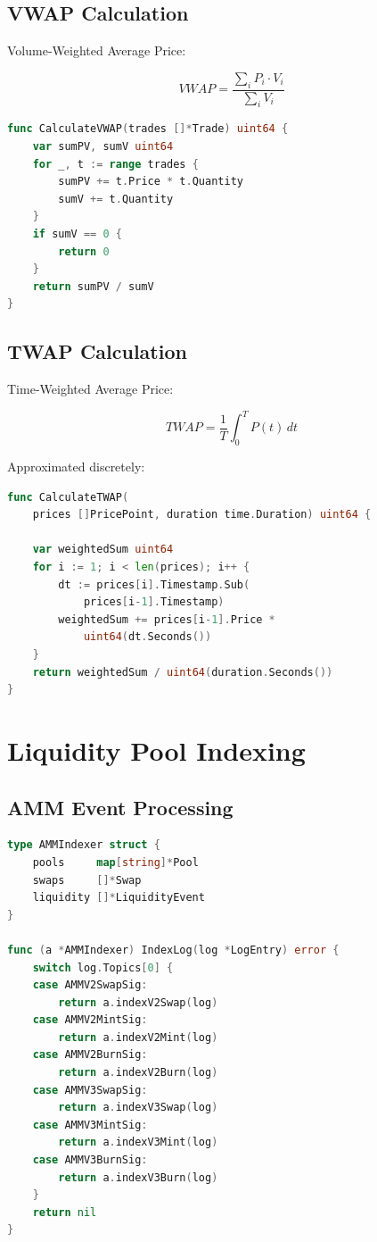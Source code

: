 \documentclass[11pt,twocolumn]{article}
\begin{document}
\subsection{VWAP Calculation}

Volume-Weighted Average Price:

\begin{equation}
VWAP = \frac{\sum_{i} P_i \cdot V_i}{\sum_{i} V_i}
\end{equation}

\begin{lstlisting}[language=Go,caption={VWAP computation}]
func CalculateVWAP(trades []*Trade) uint64 {
    var sumPV, sumV uint64
    for _, t := range trades {
        sumPV += t.Price * t.Quantity
        sumV += t.Quantity
    }
    if sumV == 0 {
        return 0
    }
    return sumPV / sumV
}
\end{lstlisting}

\subsection{TWAP Calculation}

Time-Weighted Average Price:

\begin{equation}
TWAP = \frac{1}{T} \int_{0}^{T} P(t) \, dt
\end{equation}

Approximated discretely:

\begin{lstlisting}[language=Go,caption={TWAP computation}]
func CalculateTWAP(
    prices []PricePoint, duration time.Duration) uint64 {

    var weightedSum uint64
    for i := 1; i < len(prices); i++ {
        dt := prices[i].Timestamp.Sub(
            prices[i-1].Timestamp)
        weightedSum += prices[i-1].Price *
            uint64(dt.Seconds())
    }
    return weightedSum / uint64(duration.Seconds())
}
\end{lstlisting}

\section{Liquidity Pool Indexing}

\subsection{AMM Event Processing}

\begin{lstlisting}[language=Go,caption={AMM indexer interface}]
type AMMIndexer struct {
    pools     map[string]*Pool
    swaps     []*Swap
    liquidity []*LiquidityEvent
}

func (a *AMMIndexer) IndexLog(log *LogEntry) error {
    switch log.Topics[0] {
    case AMMV2SwapSig:
        return a.indexV2Swap(log)
    case AMMV2MintSig:
        return a.indexV2Mint(log)
    case AMMV2BurnSig:
        return a.indexV2Burn(log)
    case AMMV3SwapSig:
        return a.indexV3Swap(log)
    case AMMV3MintSig:
        return a.indexV3Mint(log)
    case AMMV3BurnSig:
        return a.indexV3Burn(log)
    }
    return nil
}
\end{lstlisting}
\end{document}
